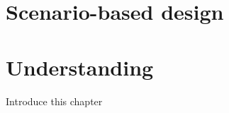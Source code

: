 %
\chapter{Scenario-based design}







\chapter{Understanding}
Introduce this chapter










		
		
		
